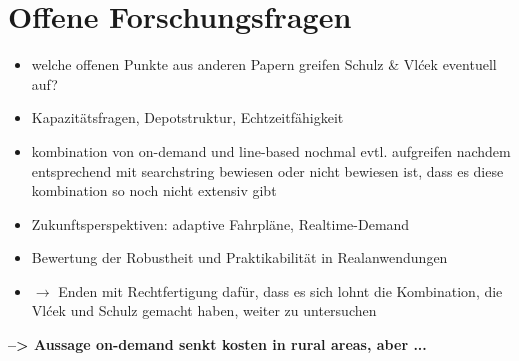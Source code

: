 \section{Offene Forschungsfragen}
\label{sec:2.3}
\label{sec:OffeneForschungsfragen}
\begin{itemize}
    \item welche offenen Punkte aus anderen Papern greifen Schulz \& Vlćek eventuell auf?
    \item Kapazitätsfragen, Depotstruktur, Echtzeitfähigkeit
    \item kombination von on-demand und line-based nochmal evtl. aufgreifen nachdem entsprechend mit searchstring bewiesen oder nicht bewiesen ist, dass es diese kombination so noch nicht extensiv gibt
    \item Zukunftsperspektiven: adaptive Fahrpläne, Realtime-Demand
    \item Bewertung der Robustheit und Praktikabilität in Realanwendungen
    \item 
    
    $\rightarrow$ Enden mit Rechtfertigung dafür, dass es sich lohnt die Kombination, die Vlćek und Schulz gemacht haben, weiter zu untersuchen
\end{itemize}

\textbf{--> Aussage on-demand senkt kosten in rural areas, aber ...}

